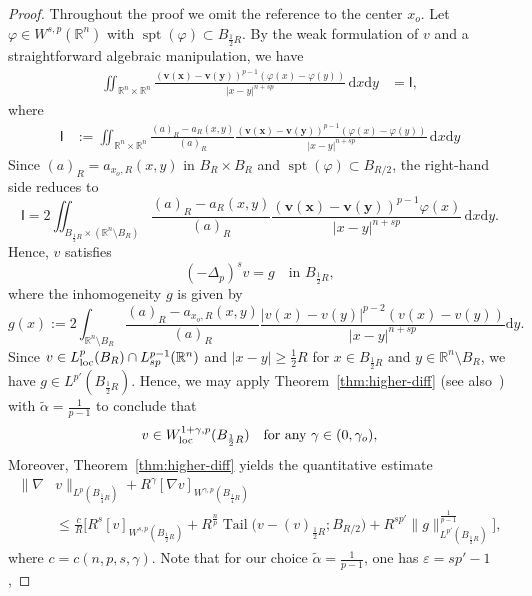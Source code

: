 \documentclass[10pt,letterpaper]{amsart}
\theoremstyle{definition}
\numberwithin{theorem}{section}
\numberwithin{equation}{section}
\newcommand{\R}{\ensuremath{\mathbb{R}}}
\newcommand{\1}{\ensuremath{\mathds{1}}}
\newcommand{\dx}{\mathrm{d}x}
\newcommand{\dy}{\mathrm{d}y}
\newcommand\sfI{{\boldsymbol{\mathsf I}}}
\renewcommand{\epsilon}{\varepsilon}
\renewcommand{\epsilon}{\varepsilon}
\DeclareMathOperator{\Tail}{Tail}
\numberwithin{equation}{section}
\begin{document}
\begin{proof}
Throughout the proof we omit the reference to the center $x_o$. 
Let $\varphi \in W^{s,p}(\R^n)$ with $\operatorname{spt}(\varphi) \subset B_{\frac12 R}$. 
By the weak formulation of $v$ and a straightforward algebraic manipulation, we have
\begin{align*}
    \iint_{\R^n\times\R^n}\frac{\boldsymbol{(v(x)-v(y))}^{p-1}(\varphi(x)-\varphi(y))}{|x-y|^{n+sp}} \,\dx\dy
    &=\sfI,
\end{align*}
where
\begin{align*}
    \sfI&:=
    \iint_{\R^n\times\R^n}\frac{(a)_{R}-a_{R}(x,y)}{(a)_{R}}\frac{\boldsymbol{(v(x)-v(y))}^{p-1}(\varphi(x)-\varphi(y))}{|x-y|^{n+sp}} \,\dx\dy
\end{align*}
Since $(a)_{R} = a_{x_o,R}(x,y)$ in $B_R \times B_R$ and $\operatorname{spt}(\varphi) \subset B_{R/2}$, the right-hand side reduces to
\[
    \sfI=
    2\iint_{B_{\frac12 R}\times(\R^n\setminus B_{R})} \frac{(a)_{R}-a_{R}(x,y)}{(a)_{R}}\frac{\boldsymbol{(v(x)-v(y))}^{p-1}\varphi(x)}{|x-y|^{n+sp}}\,\dx\dy.
\]
Hence, $v$ satisfies
\[
    (-\Delta_p)^s v = g \quad \text{in } B_{\frac12 R},
\]
where the inhomogeneity $g$ is given by
\[
    g(x) := 2 \int_{\R^n \setminus B_R} 
    \frac{(a)_R - a_{x_o,R}(x,y)}{(a)_R} \frac{
    |v(x)-v(y)|^{p-2} (v(x)-v(y))}{|x-y|^{n+sp}} \dy.
\]
Since $v \in L^p_{\rm loc}(B_R)\cap L^{p-1}_{sp}(\R^n)$ and $|x-y|\ge \frac12 R$ for $x\in B_{\frac12 R}$ and $y\in \R^n \setminus B_R$, we have $g \in L^{p'}(B_{\frac12 R})$. Hence, we may apply Theorem~\ref{thm:higher-diff} (see also~\cite[Theorem~1.2]{DKLN-higherdiff}) with $\tilde\alpha = \frac{1}{p-1}$ to conclude that
\[
    v \in W^{1+\gamma,p}_{\rm loc}(B_{\frac12 R}) \quad \text{for any } \gamma \in (0,\gamma_o),
\]
Moreover, %
Theorem~\ref{thm:higher-diff} yields the quantitative estimate
\begin{align}\label{est:v*}\nonumber
    \|\nabla &v\|_{L^p(B_{\frac14 R})}
    +  R^\gamma[\nabla v]_{W^{\gamma,p}(B_{\frac14R})}\\
    &\leq
    \frac{c}{R} \Big[
         R^s[v]_{W^{s,p}(B_{\frac12 R})}
        +  
        R^{\frac{n}{p}}\Tail\big(v-(v)_{\frac12 R}; B_{R/2}\big) +
        R^{sp'}\|g\|_{L^{p'}(B_{\frac12 R})}^{\frac{1}{p-1}}
    \Big],
\end{align}
where $c=c(n,p,s,\gamma)$. Note that for our choice $\tilde\alpha = \frac{1}{p-1}$, one has $
    \epsilon = sp' - 1$,

\end{proof}
\end{document}
